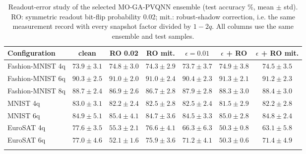 \begin{table}[t]
\caption{Readout-error study of the selected MO-GA-PVQNN ensemble (test accuracy \%, mean $\pm$ std). RO: symmetric readout bit-flip probability 0.02; mit.: robust-shadow correction, i.e. the same measurement record with every snapshot factor divided by $1-2q$. All columns use the same ensemble and test samples.}\label{tab:readout}
\footnotesize
\begin{tabular}{@{}lcccccc@{}}
\toprule
Configuration & clean & RO 0.02 & RO mit. & $\epsilon=0.01$ & $\epsilon$ + RO & $\epsilon$ + RO mit. \\
\midrule
Fashion-MNIST 4q & $73.9\pm3.1$ & $74.8\pm3.0$ & $74.3\pm2.9$ & $73.7\pm3.7$ & $74.9\pm3.8$ & $74.5\pm3.5$ \\
Fashion-MNIST 6q & $90.3\pm2.5$ & $91.0\pm2.0$ & $91.0\pm2.4$ & $90.4\pm2.3$ & $91.3\pm2.1$ & $91.2\pm2.3$ \\
Fashion-MNIST 8q & $88.7\pm2.4$ & $86.9\pm2.6$ & $86.7\pm2.8$ & $87.9\pm2.8$ & $88.3\pm3.0$ & $88.4\pm3.0$ \\
MNIST 4q & $83.0\pm3.1$ & $82.2\pm2.4$ & $82.5\pm2.8$ & $82.5\pm2.4$ & $81.5\pm2.9$ & $82.2\pm2.8$ \\
MNIST 6q & $84.9\pm5.1$ & $85.4\pm4.1$ & $84.7\pm3.6$ & $84.5\pm3.3$ & $85.0\pm2.8$ & $84.8\pm2.4$ \\
EuroSAT 4q & $77.6\pm3.5$ & $55.3\pm2.1$ & $76.6\pm4.1$ & $66.3\pm6.3$ & $50.3\pm0.8$ & $63.1\pm5.8$ \\
EuroSAT 6q & $77.0\pm4.6$ & $52.1\pm1.6$ & $75.9\pm3.6$ & $71.2\pm4.1$ & $50.3\pm0.6$ & $71.4\pm4.9$ \\
\botrule
\end{tabular}
\end{table}
